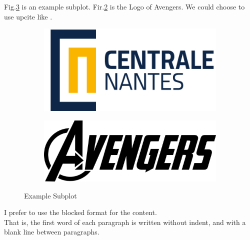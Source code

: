 \noindent
Fig.\ref{fig:ex_sub} is an example subplot. Fir.\ref{fig:ex_sub2} is the Logo of Avengers\cite{arbi2021character}. We could choose to use upcite like .
\begin{figure}[H]
    \centering
    \begin{subfigure}[b]{0.45\textwidth}
        \includegraphics[width=\textwidth]{Figures/LogoECN.png}
        \label{fig:ex_sub1}
    \end{subfigure}
    \hfill
    \begin{subfigure}[b]{0.45\textwidth}
        \includegraphics[width=\textwidth]{Figures/Logoex.png}
        \label{fig:ex_sub2}
    \end{subfigure}
    \caption{Example Subplot}
    \label{fig:ex_sub}
\end{figure}

\noindent
I prefer to use the blocked format for the content.\\

\noindent
That is, the first word of each paragraph is written without indent, and with a blank line between paragraphs.